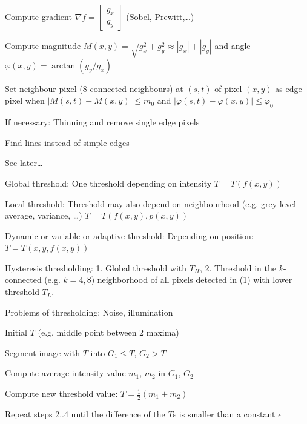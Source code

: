         \begin{aufzaehlung}
        	\item Compute gradient $\nabla f= \begin{bmatrix}g_x\\g_y\end{bmatrix}$ (Sobel, Prewitt,\ldots)
          \item Compute magnitude $M(x,y) = \sqrt{g_x^2+g_y^2} \approx |g_x| + |g_y|$ and angle $\varphi(x,y) = \arctan(g_y/g_x)$
        	\item Set neighbour pixel (8-connected neighbours) at $(s,t)$ of pixel $(x,y)$ as edge
        	pixel when $|M(s,t) - M(x,y)| \leq m_0$ and $|\varphi(s,t) - \varphi(x,y)| \leq \varphi_0$
        	\item If necessary: Thinning and remove single edge pixels
        \end{aufzaehlung}
        
        Find lines instead of simple edges
        
        See later\ldots
        
    
      \begin{liste}
      	\item Global threshold: One threshold depending on intensity $T = T(f(x,y))$
      	\item Local threshold: Threshold may also depend on neighbourhood (e.g. grey level average, variance, \ldots)
      	  $T = T(f(x,y), p(x,y))$
      	\item Dynamic or variable or adaptive threshold: Depending on position: $T = T(x,y, f(x,y))$
      	\item Hysteresis thresholding: 1. Global threshold with $T_H$, 2. Threshold in the 
      	$k$-connected (e.g. $k=4,8$) neighborhood of all pixels detected in (1) with lower threshold $T_L$.
      \end{liste}
      
      Problems of thresholding: Noise, illumination
      
      \begin{aufzaehlung}
      	\item Initial $T$ (e.g. middle point between 2 maxima)
      	\item Segment image with $T$ into $G_1 \leq T$, $G_2 > T$
      	\item Compute average intensity value $m_1$, $m_2$ in $G_1$, $G_2$
      	\item Compute new threshold value: $T = \frac12 (m_1 + m_2)$
      	\item Repeat steps 2..4 until the difference of the $T$s is smaller than a constant $\epsilon$
      \end{aufzaehlung}
  
